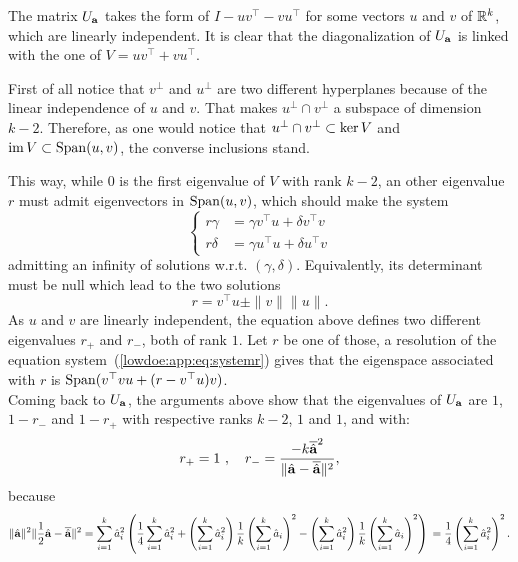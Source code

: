 The matrix $U_{\mathbf{a}}$ takes the form of $I-uv^{\top}-vu^{\top}$ for some vectors $u$ and $v$ of $\mathbb{R}^k$, which are linearly independent. It is clear that the diagonalization of $U_{\mathbf{a}}$ is linked with the one of $V=uv^{\top}+vu^{\top}$.

First of all notice that $v^\perp$ and $u^\perp$ are two different hyperplanes because of the linear independence of $u$ and $v$. That makes $u^\perp\cap v^\perp$ a subspace of dimension $k-2$. %
Therefore, as one would notice that $u^\perp\cap v^\perp\subset\operatorname{ker} V$ and $\operatorname{im} V\subset\operatorname{Span}(u,v)$, the converse inclusions stand.

This way, while $0$ is the first eigenvalue of $V$ with rank $k-2$, an other eigenvalue $r$ must admit eigenvectors in $\operatorname{Span}(u,v)$, which should make the system
    \begin{equation}\label{lowdoe:app:eq:systemr}
        \left\{\begin{array}{rl}
             r\gamma &= \gamma v^{\top}u+\delta v^{\top}v  \\
             r\delta &= \gamma u^{\top}u + \delta u^{\top}v 
        \end{array}  \right.
    \end{equation}
admitting an infinity of solutions w.r.t.{ }$(\gamma,\delta)$. Equivalently, its determinant must be null which lead to the two solutions 
    \begin{equation}
        r = v^{\top}u \pm \|v\|\|u\|.
    \end{equation}
As $u$ and $v$ are linearly independent, the equation above defines two different eigenvalues $r_+$ and $r_-$, both of rank $1$.
Let $r$ be one of those, a resolution of the equation system~(\ref{lowdoe:app:eq:systemr}) gives that the eigenspace associated with $r$ is $\operatorname{Span}(v^{\top}vu+(r-v^{\top}u)v)$.\\

Coming back to $U_{\mathbf{a}}$, the arguments above show that the eigenvalues of $U_{\mathbf{a}}$ are $1$, $1-r_-$ and $1-r_+$ with respective ranks $k-2$, $1$ and $1$, and with:
\begin{equation}
    r_+ = 1 \ ,\quad r_- = \frac{- k\overline{\hat{\mathbf{a}}}^2}{\|\hat{\mathbf{a}}-\overline{\hat{\mathbf{a}}} \|^2},
\end{equation}
because 
\begin{equation}
    \|\hatmbf a\|^2\|\frac{1}{2}\hatmbf a - \overline{\hatmbf a} \|^2  = \sum_{i=1}^k\hat a_i^2
    \left(\frac{1}{4}\sum_{i=1}^k\hat a_i^2 + \left(\sum_{i=1}^k\hat a_i^2\right)\frac{1}{k}\left(\sum_{i=1}^k\hat a_i\right)^2 - \left(\sum_{i=1}^k\hat a_i^2\right)\frac{1}{k}\left(\sum_{i=1}^k\hat a_i \right)^2 \right)\\
        = \frac{1}{4}\left(\sum_{i=1}^k\hat a_i^2\right)^2. %
\end{equation}

